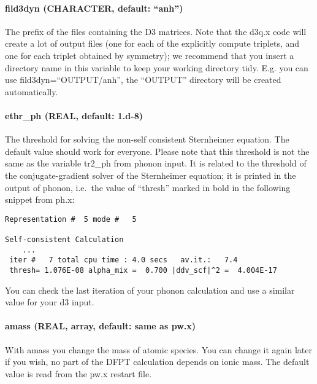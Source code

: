 \documentclass[
]{article}
\begin{document}
\hypertarget{fild3dyn-character-default-anh}{%
\paragraph{\texorpdfstring{fild3dyn (CHARACTER, default:
\enquote{anh})}{fild3dyn (CHARACTER, default: ``anh'')}}\label{fild3dyn-character-default-anh}}

The prefix of the files containing the D3 matrices. Note that the d3q.x
code will create a lot of output files (one for each of the explicitly
compute triplets, and one for each triplet obtained by symmetry); we
recommend that you insert a directory name in this variable to keep your
working directory tidy. E.g. you can use fild3dyn=\enquote{OUTPUT/anh},
the \enquote{OUTPUT} directory will be created automatically.

\hypertarget{ethr_ph-real-default-1.d-8}{%
\paragraph{ethr\_ph (REAL, default:
1.d-8)}\label{ethr_ph-real-default-1.d-8}}

The threshold for solving the non-self consistent Sternheimer equation.
The default value should work for everyone. Please note that this
threshold is not the same as the variable tr2\_ph from phonon input. It
is related to the threshold of the conjugate-gradient solver of the
Sternheimer equation; it is printed in the output of phonon, i.e.~the
value of \enquote{thresh} marked in bold in the following snippet from
ph.x:

\begin{verbatim}
Representation #  5 mode #   5 

Self-consistent Calculation 
    ...
 iter #   7 total cpu time : 4.0 secs   av.it.:   7.4
 thresh= 1.076E-08 alpha_mix =  0.700 |ddv_scf|^2 =  4.004E-17
\end{verbatim}

You can check the last iteration of your phonon calculation and use a
similar value for your d3 input.

\hypertarget{amass-real-array-default-same-as-pw.x}{%
\paragraph{amass (REAL, array, default: same as
pw.x)}\label{amass-real-array-default-same-as-pw.x}}

With amass you change the mass of atomic species. You can change it
again later if you wish, no part of the DFPT calculation depends on
ionic mass. The default value is read from the pw.x restart file.
\end{document}
